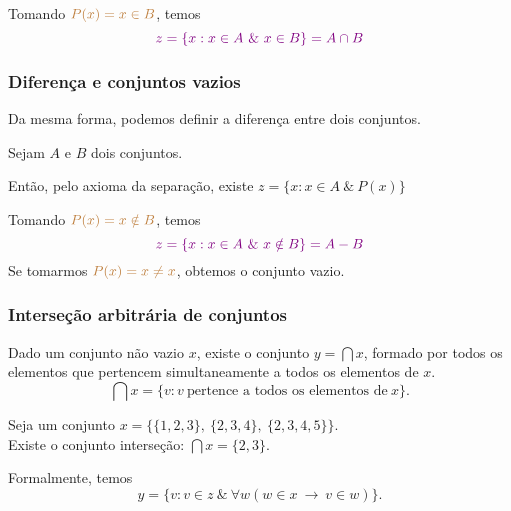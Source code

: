 Tomando $\color{brown}{P(x) = x \in B}$, temos
$$\color{violet}{z = \{x: x \in A\ \&\ x \in B \} = A \cap B}$$

\subsubsection*{Diferença e conjuntos vazios}
Da mesma forma, podemos definir a diferença entre dois conjuntos.

Sejam $A$ e $B$ dois conjuntos.

Então, pelo axioma da separação, existe $z = \{x: x \in A\ \&\ P(x)\}$

Tomando $\color{brown}{P(x) = x \notin B}$, temos
$$\color{violet}{z = \{x: x \in A\ \&\ x \notin B \} = A - B}$$
Se tomarmos $\color{brown}{P(x) = x \neq x}$, obtemos o conjunto vazio.

\subsubsection*{Interseção arbitrária de conjuntos}
\begin{theorem}
    Dado um conjunto não vazio $x$, existe o conjunto $y = \bigcap x$, formado por todos os elementos que pertencem simultaneamente a todos os elementos de $x$.
$$\bigcap x = \{v: v\ \textrm{pertence a todos os elementos de}\ x\}.$$
\end{theorem}
\begin{exmp}
    Seja um conjunto $x = \{\{1,2,3\},\ \{2,3,4\},\ \{2,3,4,5\}\}.$\\
    Existe o conjunto interseção: $\bigcap x = \{2,3\}.$

    Formalmente, temos $$y = \{v: v \in z\ \&\ \forall w (w \in x\ \rightarrow\ v \in w)\}.$$
\end{exmp}
